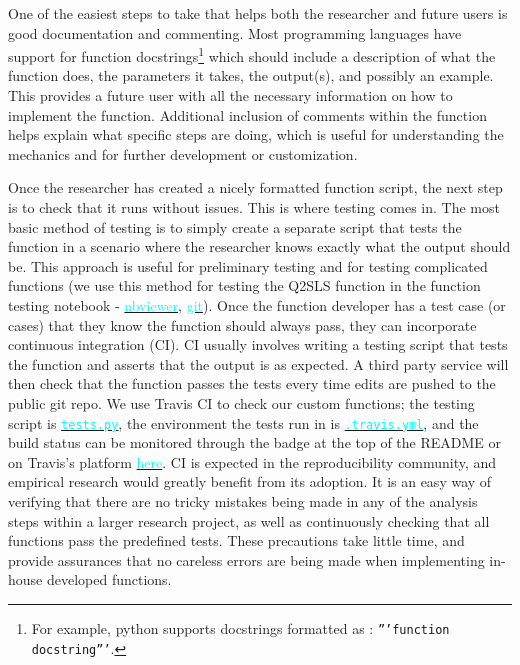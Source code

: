 \documentclass[12pt]{article}
\newcommand{\inlinecode}{\texttt}
\begin{document}
One of the easiest steps to take that helps both the researcher and future users is good documentation and commenting. Most programming languages have support for function docstrings\footnote{For example, python supports docstrings formatted as : \inlinecode{'''function docstring'''}.} which should include a description of what the function does, the parameters it takes, the output(s), and possibly an example. This provides a future user with all the necessary information on how to implement the function. Additional inclusion of comments within the function helps explain what specific steps are doing, which is useful for understanding the mechanics and for further development or customization.

Once the researcher has created a nicely formatted function script, the next step is to check that it runs without issues. This is where testing comes in. The most basic method of testing is to simply create a separate script that tests the function in a scenario where the researcher knows exactly what the output should be. This approach is useful for preliminary testing and for testing complicated functions (we use this method for testing the Q2SLS function in the function testing notebook - \href{https://nbviewer.jupyter.org/github/nadavtadelis/Reproducible_Metrics/blob/master/function_testing.ipynb}{\textcolor{cyan}{nbviewer}}, \href{https://github.com/nadavtadelis/Reproducible_Metrics/blob/master/function_testing.ipynb}{\textcolor{cyan}{git}}). Once the function developer has a test case (or cases) that they know the function should always pass, they can incorporate continuous integration (CI). CI usually involves writing a testing script that tests the function and asserts that the output is as expected. A third party service will then check that the function passes the tests every time edits are pushed to the public git repo. We use Travis CI to check our custom functions; the testing script is \href{https://github.com/nadavtadelis/Reproducible_Metrics/blob/master/tests.py}{\textcolor{cyan}{\inlinecode{tests.py}}}, the environment the tests run in is \href{https://github.com/nadavtadelis/Reproducible_Metrics/blob/master/.travis.yml}{\textcolor{cyan}{\inlinecode{.travis.yml}}}, and the build status can be monitored through the badge at the top of the README or on Travis's platform \href{https://travis-ci.org/nadavtadelis/Reproducible_Metrics}{\textcolor{cyan}{here}}. CI is expected in the reproducibility community, and empirical research would greatly benefit from its adoption. It is an easy way of verifying that there are no tricky mistakes being made in any of the analysis steps within a larger research project, as well as continuously checking that all functions pass the predefined tests. These precautions take little time, and provide assurances that no careless errors are being made when implementing in-house developed functions.
\end{document}
